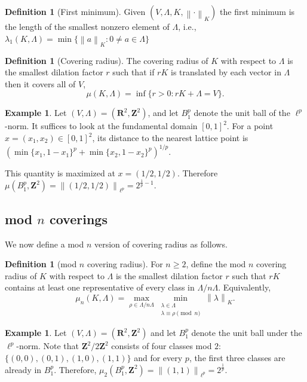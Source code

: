 \documentclass[11pt,reqno]{amsart}
\numberwithin{equation}{section}
\numberwithin{equation}{section}
\theoremstyle{definition}
\newtheorem{definition}[theorem]{Definition}
\newtheorem{exam}[theorem]{Example}
\newcommand{\R}{\mathbf R}
\newcommand{\Z}{\mathbf Z}
\newcommand{\norm}[1]{\left\lVert #1\right\rVert}
\begin{document}
\begin{definition}[First minimum]\label{def:first-minimum}
    Given $(V,\Lambda,K, \norm{\cdot}_{K})$ the first minimum is the length of the smallest nonzero element of $\Lambda$, i.e.,  
    \(\lambda_1(K,\Lambda)=\min\{\norm{a}_K:0\neq a\in\Lambda\}\)
\end{definition}

\begin{definition}[Covering radius]\label{def:coverrad}
    The covering radius of \(K\) with respect to \(\Lambda\) is the smallest dilation factor $r$ such that if $rK$ is translated by each vector in $\Lambda$ then it covers all of $V$,
\[
\mu(K,\Lambda)=\inf\{r>0:rK+\Lambda=V\}.
\]
\end{definition}
\begin{exam}
Let \((V,\Lambda)=(\R^2,\Z^2)\), and let \(B_1^p\) denote the unit ball of the \(\ell^p\)-norm. It suffices to look at the fundamental domain \([0,1]^2\). For a point \(x=(x_1,x_2)\in[0,1]^2\), its distance to the nearest lattice point is \(\left(
\min\{x_1,1-x_1\}^p+
\min\{x_2,1-x_2\}^p
\right)^{1/p}.\) 

This quantity is maximized at \(x=(1/2,1/2)\). Therefore \(\mu(B_1^p,\Z^2)
=
\norm{(1/2,1/2)}_{\ell^p}
= 2^{\frac1p-1}.\) 
\end{exam}
\subsection{mod $n$ coverings} We now define a mod $n$ version of covering radius as follows.

\begin{definition}[mod $n$ covering radius]\label{def:modn-rad}
    For \(n\ge2\), define the mod \(n\) covering radius of \(K\) with respect to \(\Lambda\) is the smallest dilation factor \(r\) such that \(rK\) contains at least one representative of every class in \(\Lambda/n\Lambda\). Equivalently,
\[
\mu_n(K,\Lambda)
=
\max_{\rho\in\Lambda/n\Lambda}
\min_{\substack{\lambda\in\Lambda\\ \lambda\equiv\rho\pmod n}}
\norm{\lambda}_K.
\]
\end{definition}
\begin{exam}
    Let $(V,\Lambda)=(\R^2,\Z^2)$ and let $B_1^p$ denote the unit ball under the $\ell^p$-norm. Note that $\Z^2/2\Z^2$ consists of four classes mod $2$: $\{(0,0),(0,1),(1,0),(1,1)\}$ and for every $p$, the first three classes are already in $B_1^p$. Therefore, \( \mu_2(B_1^p,\Z^2) = \norm{(1,1)}_{\ell^p}=2^{\frac{1}{p}}.\) 
\end{exam}
\end{document}
